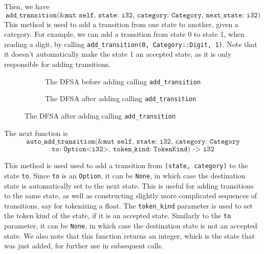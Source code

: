 \documentclass{article}
\newcommand{\code}[1]{\texttt{#1}}
\begin{document}
Then, we have $$\code{add\_transition(\&mut self, state: i32, category:
        Category, next\_state: i32)}$$ This method is used to add a transition from one
state to another, given a category. For example, we can add a transition from
state 0 to state 1, when reading a digit, by calling \code{add\_transition(0,
    Category::Digit, 1)}. Note that it doesn't automatically make the state 1 an
accepted state, as it is only responsible for adding transitions.


\begin{figure}[H]
    \begin{subfigure}[t]{0.5\textwidth}
        \centering
        \caption{The DFSA before adding calling \code{add\_transition}}
    \end{subfigure}
    \begin{subfigure}[t]{0.5\textwidth}
        \centering

        \caption{The DFSA after adding calling \code{add\_transition}}
    \end{subfigure}
\end{figure}

The next function is $$\code{auto\_add\_transition(\&mut self, state: i32,
        category: Category}$$
$$\code{to: Option<i32>, token\_kind: TokenKind) -> i32}$$

This method is used used to add a transition from \code{(state, category)} to
the state \code{to}. Since \code{to} is an \code{Option}, it can be \code{None},
in which case the destination state is automatically set to the next state. This
is useful for adding transitions to the same state, as well as constructing
slightly more complicated sequences of transitions, say for tokenizing a float.
The \code{token\_kind} parameter is used to set the token kind of the state, if
it is an accepted state. Similarly to the \code{to} parameter, it can be
\code{None}, in which case the destination state is not an accepted state.  We
also note that this function returns an integer, which is the state that was
just added, for further use in subsequent calls.
\end{document}
